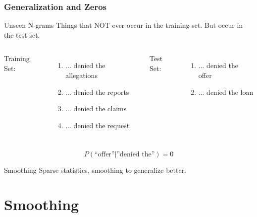\documentclass{beamer}
\begin{document}
\begin{frame}\frametitle{Generalization and Zeros}

\begin{block}{Unseen N-grams}
Things that NOT ever occur in the training set. But occur in the test
set. 

\end{block}

\begin{columns}[t] %
Training Set:
\begin{enumerate}
\item ... denied the allegations
\item ... denied the reports
\item ... denied the claims
\item ... denied the request
\end{enumerate}

Test Set:
\begin{enumerate}
\item ... denied the offer
\item ... denied the loan
\end{enumerate}
\end{columns}
$$
P(\text{``offer''}|\text{''denied the''}) = 0
$$

\begin{block}{Smoothing}
Sparse statistics, smoothing to generalize better.
\end{block}
\end{frame}


\section{Smoothing}
\end{document}
